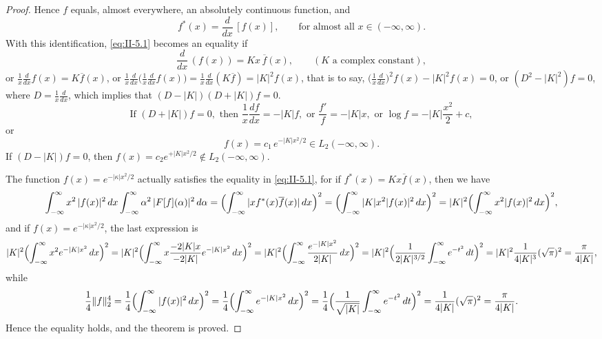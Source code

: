 \begin{proof}
Hence $f$ equals, almost everywhere, an absolutely continuous function, and
\begin{equation}\tag{5.14}\label{eq:II-5.14}
f^{*}(x)=\frac{d}{dx}\,[f(x)],\qquad\text{for almost all }x\in(-\infty,\infty).
\end{equation}
With this identification, \eqref{eq:II-5.1} becomes an equality if
\[
\frac{d}{dx}\,(f(x))=K x\,\overline{f}(x),\qquad(K\text{ a complex constant}),
\]
or $\frac{1}{x}\frac{d}{dx}f(x)=K\overline{f}(x)$, or $\frac{1}{x}\frac{d}{dx}\bigl(\frac{1}{x}\frac{d}{dx}f(x)\bigr)=\frac{1}{x}\frac{d}{dx}(K\overline{f})=|K|^{2}f(x)$, that is to say, $\bigl(\frac{1}{x}\frac{d}{dx}\bigr)^{2}f(x)-|K|^{2}f(x)=0$, or $(D^{2}-|K|^{2})f=0$, where $D=\frac{1}{x}\frac{d}{dx}$, which implies that $(D-|K|)(D+|K|)f=0$.
\[
\text{If }(D+|K|)f=0,\text{ then }\frac{1}{x}\frac{df}{dx}=-|K|f,\text{ or }\frac{f'}{f}=-|K|x,\text{ or }\log f=-|K|\frac{x^{2}}{2}+c,
\]
or
\begin{equation}\tag{5.15}\label{eq:II-5.15}
f(x)=c_{1}\,e^{-|K|x^{2}/2}\in L_{2}(-\infty,\infty).
\end{equation}
If $(D-|K|)f=0$, then $f(x)=c_{2}e^{+|K|x^{2}/2}\notin L_{2}(-\infty,\infty)$.

The function $f(x)=e^{-|\kappa|x^{2}/2}$ actually satisfies the equality in \eqref{eq:II-5.1}, for if $f^{*}(x)=K x\overline{f}(x)$, then we have
\[
\int_{-\infty}^{\infty}x^{2}\,|f(x)|^{2}\,dx
\int_{-\infty}^{\infty}\alpha^{2}\,|F[f](\alpha)|^{2}\,d\alpha
=\Bigl(\int_{-\infty}^{\infty}|x f^{*}(x)\overline{f}(x)|\,dx\Bigr)^{2}
=\Bigl(\int_{-\infty}^{\infty}|K|x^{2}|f(x)|^{2}\,dx\Bigr)^{2}
=|K|^{2}\Bigl(\int_{-\infty}^{\infty}x^{2}|f(x)|^{2}\,dx\Bigr)^{2},
\]
and if $f(x)=e^{-|\kappa|x^{2}/2}$, the last expression is
\[
|K|^{2}\Bigl(\int_{-\infty}^{\infty}x^{2}e^{-|K|x^{2}}\,dx\Bigr)^{2}
=|K|^{2}\Bigl(\int_{-\infty}^{\infty}x\frac{-2|K|x}{-2|K|}e^{-|K|x^{2}}\,dx\Bigr)^{2}
=|K|^{2}\Bigl(\int_{-\infty}^{\infty}\frac{e^{-|K|x^{2}}}{2|K|}\,dx\Bigr)^{2}
=|K|^{2}\Bigl(\frac{1}{2|K|^{3/2}}\int_{-\infty}^{\infty}e^{-t^{2}}\,dt\Bigr)^{2}
=|K|^{2}\frac{1}{4|K|^{3}}(\sqrt{\pi})^{2}=\frac{\pi}{4|K|},
\]
while
\[
\frac{1}{4}\|f\|_{2}^{4}
=\frac{1}{4}\Bigl(\int_{-\infty}^{\infty}|f(x)|^{2}\,dx\Bigr)^{2}
=\frac{1}{4}\Bigl(\int_{-\infty}^{\infty}e^{-|K|x^{2}}\,dx\Bigr)^{2}
=\frac{1}{4}\Bigl(\frac{1}{\sqrt{|K|}}\int_{-\infty}^{\infty}e^{-t^{2}}\,dt\Bigr)^{2}
=\frac{1}{4|K|}(\sqrt{\pi})^{2}=\frac{\pi}{4|K|}.
\]
Hence the equality holds, and the theorem is proved.
\end{proof}

